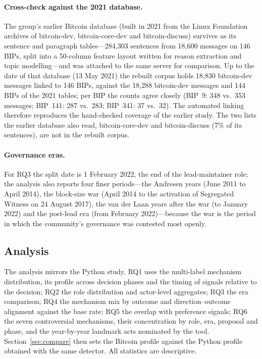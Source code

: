 \documentclass[sigconf,screen]{acmart}
\begin{document}
\paragraph{Cross-check against the 2021 database.} The group's earlier Bitcoin database (built in 2021 from the Linux Foundation archives of bitcoin-dev, bitcoin-core-dev and bitcoin-discuss) survives as its sentence and paragraph tables---284,303 sentences from 18,600 messages on 146 BIPs, split into a 50-column feature layout written for reason extraction and topic modelling---and was attached to the same server for comparison. Up to the date of that database (13 May 2021) the rebuilt corpus holds 18,830 bitcoin-dev messages linked to 146 BIPs, against the 18,288 bitcoin-dev messages and 144 BIPs of the 2021 tables; per BIP the counts agree closely (BIP~9: 348 vs.\ 353 messages; BIP~141: 287 vs.\ 283; BIP~341: 37 vs.\ 32). The automated linking therefore reproduces the hand-checked coverage of the earlier study. The two lists the earlier database also read, bitcoin-core-dev and bitcoin-discuss (7\% of its sentences), are not in the rebuilt corpus.

\paragraph{Governance eras.} For RQ3 the split date is 1 February 2022, the end of the lead-maintainer role; the analysis also reports four finer periods---the Andresen years (June 2011 to April 2014), the block-size war (April 2014 to the activation of Segregated Witness on 24 August 2017), the van der Laan years after the war (to January 2022) and the post-lead era (from February 2022)---because the war is the period in which the community's governance was contested most openly.

\subsection{Analysis}

The analysis mirrors the Python study. RQ1 uses the multi-label mechanism distribution, its profile across decision phases and the timing of signals relative to the decision; RQ2 the role distribution and actor-level aggregates; RQ3 the era comparison; RQ4 the mechanism mix by outcome and direction--outcome alignment against the base rate; RQ5 the overlap with preference signals; RQ6 the seven controversial mechanisms, their concentration by role, era, proposal and phase, and the year-by-year landmark acts nominated by the tool. Section~\ref{sec:compare} then sets the Bitcoin profile against the Python profile obtained with the same detector. All statistics are descriptive.
\end{document}
